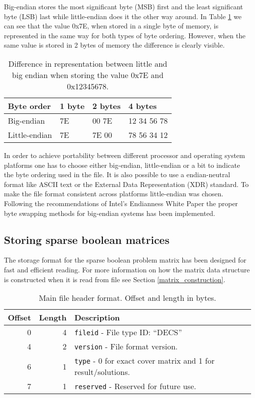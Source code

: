 Big-endian stores the most significant byte (MSB) first and the least significant byte (LSB) last while little-endian does it the other way around.
In Table \ref{tab:endian} we can see that the value 0x7E, when stored in a single byte of memory, is represented in the same way for both types of byte ordering.
However, when the same value is stored in 2 bytes of memory the difference is clearly visible.

\begin{table}[htbp]
	\centering
	\begin{tabular}{|l||l|l||l|}
		\hline
		\bf Byte order & \bf 1 byte & \bf 2 bytes & \bf 4 bytes \\ \hline
		Big-endian    & 7E & 00 7E & 12 34 56 78 \\ \hline
		Little-endian & 7E & 7E 00 & 78 56 34 12 \\ \hline
	\end{tabular}
	\caption{Difference in representation between little and big endian when storing the value 0x7E and 0x12345678.}
	\label{tab:endian}
\end{table}

In order to achieve portability between different processor and operating system platforms one has to choose either big-endian, little-endian or a bit to indicate the byte ordering used in the file.
It is also possible to use a endian-neutral format like ASCII text or the External Data Representation (XDR) \cite{RFC4506} standard.
To make the file format consistent across platforms little-endian was chosen.
Following the recommendations of Intel's Endianness White Paper \cite{intel-endian} the proper byte swapping methods for big-endian systems has been implemented.


\subsection{Storing sparse boolean matrices}

The storage format for the sparse boolean problem matrix has been designed for fast and efficient reading.
For more information on how the matrix data structure is constructed when it is read from file see Section \ref{matrix_construction}.

\begin{table}[htbp]
	\centering
	\begin{tabular}{|r|r|p{3.2in}|}
		\hline
		\bf Offset & \bf Length & \bf Description \\ \hline
		0  & 4 & \texttt{fileid} - File type ID: ``DECS'' \\ \hline
		4  & 2 & \texttt{version} - File format version. \\ \hline
		6  & 1 & \texttt{type} - 0 for exact cover matrix and 1 for result/solutions. \\ \hline
		7  & 1 & \texttt{reserved} - Reserved for future use. \\ \hline
	\end{tabular}
	\caption{Main file header format. Offset and length in bytes.}
	\label{tab:header-main}
\end{table}

